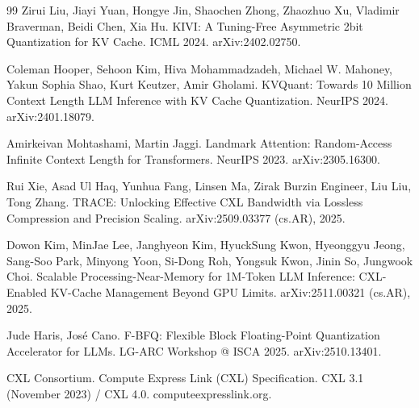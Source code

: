 \documentclass[11pt]{article}
\begin{document}
\begin{thebibliography}{99}
 Zirui Liu, Jiayi Yuan, Hongye Jin, Shaochen Zhong, Zhaozhuo Xu, Vladimir Braverman, Beidi Chen, Xia Hu. KIVI: A Tuning-Free Asymmetric 2bit Quantization for KV Cache. ICML 2024. arXiv:2402.02750.

 Coleman Hooper, Sehoon Kim, Hiva Mohammadzadeh, Michael W. Mahoney, Yakun Sophia Shao, Kurt Keutzer, Amir Gholami. KVQuant: Towards 10 Million Context Length LLM Inference with KV Cache Quantization. NeurIPS 2024. arXiv:2401.18079.

 Amirkeivan Mohtashami, Martin Jaggi. Landmark Attention: Random-Access Infinite Context Length for Transformers. NeurIPS 2023. arXiv:2305.16300.

 Rui Xie, Asad Ul Haq, Yunhua Fang, Linsen Ma, Zirak Burzin Engineer, Liu Liu, Tong Zhang. TRACE: Unlocking Effective CXL Bandwidth via Lossless Compression and Precision Scaling. arXiv:2509.03377 (cs.AR), 2025.

 Dowon Kim, MinJae Lee, Janghyeon Kim, HyuckSung Kwon, Hyeonggyu Jeong, Sang-Soo Park, Minyong Yoon, Si-Dong Roh, Yongsuk Kwon, Jinin So, Jungwook Choi. Scalable Processing-Near-Memory for 1M-Token LLM Inference: CXL-Enabled KV-Cache Management Beyond GPU Limits. arXiv:2511.00321 (cs.AR), 2025.

 Jude Haris, Jos\'e Cano. F-BFQ: Flexible Block Floating-Point Quantization Accelerator for LLMs. LG-ARC Workshop @ ISCA 2025. arXiv:2510.13401.

 CXL Consortium. Compute Express Link (CXL) Specification. CXL 3.1 (November 2023) / CXL 4.0. computeexpresslink.org.

\end{thebibliography}
\end{document}
